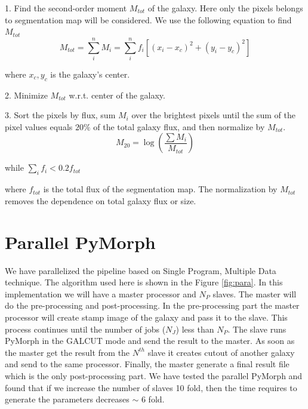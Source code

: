 \documentclass[a4paper,10pt]{article}
\begin{document}
1. Find the second-order moment $M_{tot}$ of the galaxy. Here only the pixels belongs to segmentation map will be considered. We use the following equation to find $M_{tot}$
\begin{equation}
M_{tot}=\sum_{i}^n M_i=\sum_{i}^n f_i\left[ (x_i-x_c)^2 +(y_i-y_c)^2\right]
\end{equation}

where $x_c, y_c$ is the galaxy's center.

2. Minimize $M_{tot}$ w.r.t. center of the galaxy.

3. Sort the pixels by flux, sum $M_i$ over the brightest pixels until the sum of the pixel values equals $20\%$  of the total galaxy flux, and then normalize by $M_{tot}$.
\begin{equation}
M_20 = \log\left( \frac{\sum M_i}{M_{tot}}\right)
\end{equation}

while $\sum_i f_i <0.2 f_{tot}$

where $f_{tot}$ is the total flux of the segmentation map. The normalization by $M_{tot}$ removes the dependence  on total galaxy flux or size.

\section{Parallel PyMorph}
We have parallelized the pipeline based on Single Program, Multiple Data technique. The algorithm used here is shown in the Figure \ref{fig:para}. In this implementation we will have a master processor and $N_P$ slaves. The master will do the pre-processing and post-processing. In the pre-processing part the master processor will create stamp image of the galaxy and pass it to the slave. This process continues until the number of jobs ($N_J$) less than $N_P$. The slave runs PyMorph in the GALCUT mode and send the result to the master. As soon as the master get the result from the $N^{th}$ slave it creates cutout of another galaxy and send to the same processor. Finally, the master generate a final result file which is the only post-processing part. We have tested the parallel PyMorph and found that if we increase the number of slaves 10 fold, then the time requires to generate the parameters decreases $\sim$ 6 fold.
\end{document}
